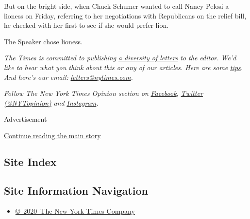 But on the bright side, when Chuck Schumer wanted to call Nancy Pelosi a
lioness on Friday, referring to her negotiations with Republicans on the
relief bill, he checked with her first to see if she would prefer lion.

The Speaker chose lioness.

\emph{The Times is committed to publishing}
\href{https://www.nytimes.com/2019/01/31/opinion/letters/letters-to-editor-new-york-times-women.html}{\emph{a
diversity of letters}} \emph{to the editor. We'd like to hear what you
think about this or any of our articles. Here are some}
\href{https://help.nytimes.com/hc/en-us/articles/115014925288-How-to-submit-a-letter-to-the-editor}{\emph{tips}}\emph{.
And here's our email:}
\href{mailto:letters@nytimes.com}{\emph{letters@nytimes.com}}\emph{.}

\emph{Follow The New York Times Opinion section on}
\href{https://www.facebook.com/nytopinion}{\emph{Facebook}}\emph{,}
\href{http://twitter.com/NYTOpinion}{\emph{Twitter (@NYTopinion)}}
\emph{and}
\href{https://www.instagram.com/nytopinion/}{\emph{Instagram}}\emph{.}

Advertisement

\protect\hyperlink{after-bottom}{Continue reading the main story}

\hypertarget{site-index}{%
\subsection{Site Index}\label{site-index}}

\hypertarget{site-information-navigation}{%
\subsection{Site Information
Navigation}\label{site-information-navigation}}

\begin{itemize}
\tightlist
\item
  \href{https://help.nytimes.com/hc/en-us/articles/115014792127-Copyright-notice}{©~2020~The
  New York Times Company}
\end{itemize}

